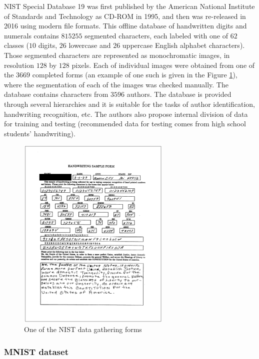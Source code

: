 \documentclass[eng]{simposium}
\begin{document}
NIST Special Database 19 \cite{12,13} was first published by the American National Institute of Standards and Technology as CD-ROM in 1995, and then was  
re-released in 2016 using modern file formats.  
This offline database of handwritten digits and numerals contains $815255$ segmented characters, each labeled  
with one of $62$ classes ($10$ digits, $26$ lowercase and $26$ uppercase English alphabet characters).  
Those segmented characters are represented as monochromatic images, in resolution $128$ by $128$ pixels.  
Each of individual images were obtained from one of the $3669$ completed forms (an example of one such is given in the Figure \ref{fig:nist}),  
where the segmentation of each of the images was checked manually.  
The database contains characters from $3596$ authors.  
The database is provided through several hierarchies and it is suitable for the tasks of author identification, handwriting recognition, etc.  
The authors also propose internal division of data for training and testing  
(recommended data for testing comes from high school students' handwriting).  

\begin{figure}[!ht] 
  \centering 
  \includegraphics[width=0.65\textwidth]{nist.png} 
  \caption{One of the NIST data gathering forms \cite{9}} 
  \label{fig:nist} 
\end{figure} 

\subsubsection{MNIST dataset} 
\end{document}
